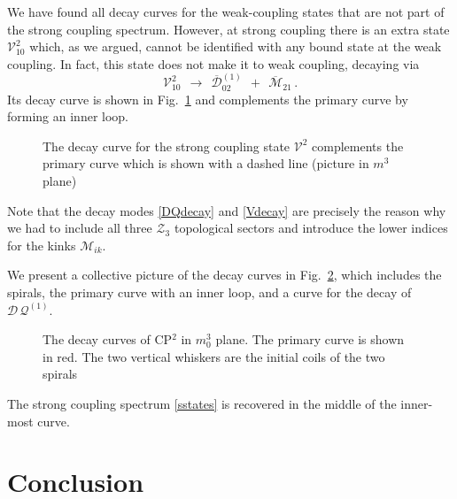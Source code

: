 \documentclass[epsfig,12pt]{article}
\def\beq{\begin{equation}}
\def\eeq{\end{equation}}
\def\beq{\begin{equation}}
\def\eeq{\end{equation}}
\newcommand{\ov}{\overline}
\newcommand{\mc}[1]{\mathcal{#1}}
\newcommand{\M}{\mathcal{M}}
\newcommand{\bM}{\ov{\mathcal{M}}{}}
\newcommand{\Q}{\mathcal{Q}}
\newcommand{\D}{\mathcal{D}}
\newcommand{\V}{\mathcal{V}}
\begin{document}
	We have found all decay curves for the weak-coupling states that are not part of the strong coupling spectrum.
	However, at strong coupling there is an extra state $ \V_{10}^2 $ which, as we argued, cannot be identified with
	any bound state at the weak coupling.
	In fact, this state does not make it to weak coupling, decaying via
\beq
\label{Vdecay}
	\V_{10}^2  ~~\longrightarrow~~  \ov{\D}{}_{02}^{(1)}  ~~+~~  \bM_{21}\,.
\eeq
	Its decay curve is shown in Fig.~\ref{fvdecay} and complements the primary curve by forming an inner loop.
\begin{figure}
\begin{center}
\epsfxsize=7.5cm
\caption{\small The decay curve for the strong coupling state $ \V^2 $ complements the primary curve
		which is shown with a dashed line (picture in $ m^3 $ plane)}
\label{fvdecay}
\end{center}
\end{figure}
	Note that the decay modes \eqref{DQdecay} and \eqref{Vdecay} are precisely the reason why we had to include all
	three $ \mc{Z}_3 $ topological sectors and introduce the lower indices for the kinks $ \M_{ik} $.

	We present a collective picture of the decay curves in Fig.~\ref{fdecays}, which includes the spirals, the 
	primary curve with an inner loop, and a curve for the decay of $ \D\,\Q^{(1)} $.
\begin{figure}
\begin{center}
\epsfxsize=8.0cm
\caption{\small The decay curves of CP$^2$ in $ m_0^3 $ plane. 
		The primary curve is shown in red.
		The two vertical whiskers are the initial coils of the two spirals}
\label{fdecays}
\end{center}
\end{figure}
	The strong coupling spectrum \eqref{sstates} is recovered in the middle of the inner-most curve.	

\newpage

\section{Conclusion}
\label{conclu}
\setcounter{equation}{0}
\end{document}
